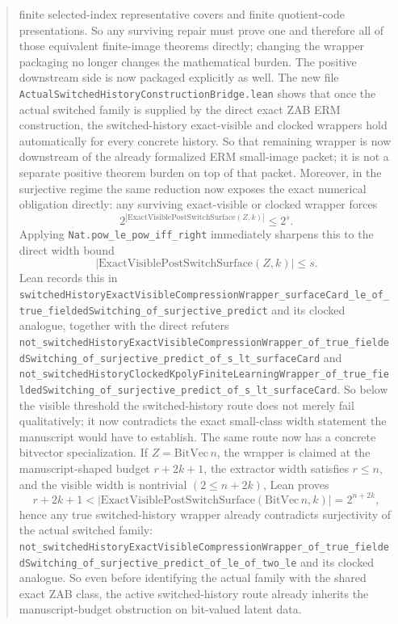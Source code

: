 \documentclass[11pt]{article}
\theoremstyle{remark}
\begin{document}
\begin{abstract}
finite selected-index representative covers and finite quotient-code
presentations.  So any surviving repair must prove one and therefore all of
those equivalent finite-image theorems directly; changing the wrapper packaging
no longer changes the mathematical burden.
The positive downstream side is now packaged explicitly as well.  The new file
\texttt{ActualSwitchedHistoryConstructionBridge.lean} shows that once the
actual switched family is supplied by the direct exact ZAB ERM construction,
the switched-history exact-visible and clocked wrappers hold automatically for
every concrete history.  So that remaining wrapper is now downstream of the
already formalized ERM small-image packet; it is not a separate positive
theorem burden on top of that packet.
Moreover, in the surjective regime the same reduction now exposes the exact
numerical obligation directly: any surviving exact-visible or clocked wrapper
forces
\[
  2^{|\mathrm{ExactVisiblePostSwitchSurface}(Z,k)|} \le 2^s.
\]
Applying \texttt{Nat.pow\_le\_pow\_iff\_right} immediately sharpens this to the
direct width bound
\[
  |\mathrm{ExactVisiblePostSwitchSurface}(Z,k)| \le s.
\]
Lean records this in
\texttt{switchedHistoryExactVisibleCompressionWrapper\_surfaceCard\_le\_of\_true\_fieldedSwitching\_of\_surjective\_predict}
and its clocked analogue, together with the direct refuters
\texttt{not\_switchedHistoryExactVisibleCompressionWrapper\_of\_true\_fieldedSwitching\_of\_surjective\_predict\_of\_s\_lt\_surfaceCard}
and
\texttt{not\_switchedHistoryClockedKpolyFiniteLearningWrapper\_of\_true\_fieldedSwitching\_of\_surjective\_predict\_of\_s\_lt\_surfaceCard}.
So below the visible threshold the switched-history route does not merely fail
qualitatively; it now contradicts the exact small-class width statement the
manuscript would have to establish.
The same route now has a concrete bitvector specialization.  If
\(Z = \mathrm{BitVec}\,n\), the wrapper is claimed at the manuscript-shaped
budget \(r + 2k + 1\), the extractor width satisfies \(r \le n\), and the
visible width is nontrivial \((2 \le n + 2k)\), Lean proves
\[
  r + 2k + 1 < |\mathrm{ExactVisiblePostSwitchSurface}(\mathrm{BitVec}\,n,k)|
    = 2^{n+2k},
\]
hence any true switched-history wrapper already contradicts surjectivity of the
actual switched family:
\texttt{not\_switchedHistoryExactVisibleCompressionWrapper\_of\_true\_fieldedSwitching\_of\_surjective\_predict\_of\_le\_of\_two\_le}
and its clocked analogue.  So even before identifying the actual family with
the shared exact ZAB class, the active switched-history route already inherits
the manuscript-budget obstruction on bit-valued latent data.

\end{abstract}
\end{document}
